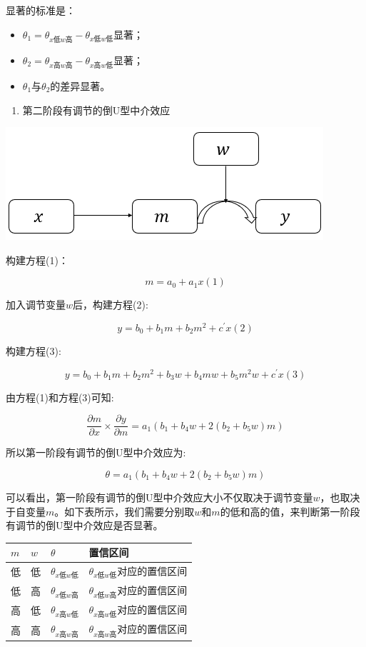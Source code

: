 \documentclass[
]{book}
\providecommand{\tightlist}{%
  \setlength{\itemsep}{0pt}\setlength{\parskip}{0pt}}
\begin{document}
显著的标准是：

\begin{itemize}
\item
  \(\theta_{1}=\theta_{x低w高}-\theta_{x低w低}\)显著；
\item
  \(\theta_{2}=\theta_{x高w高}-\theta_{x高w低}\)显著；
\item
  \(\theta_{1}\)与\(\theta_{2}\)的差异显著。
\end{itemize}

\begin{enumerate}
\def\labelenumi{\arabic{enumi}.}
\setcounter{enumi}{4}
\tightlist
\item
  第二阶段有调节的倒U型中介效应
\end{enumerate}

\includegraphics{figs/1225.png}

构建方程(1)：

\[
m=a_{0}+a_{1}x(1)
\]

加入调节变量\(w\)后，构建方程(2):

\[
y=b_{0}+b_{1}m+b_{2}m^{2}+c^{'}x(2)
\]

构建方程(3):

\[
y=b_{0}+b_{1}m+b_{2}m^{2}+b_{3}w+b_{4}mw+b_{5}m^{2}w+c^{'}x(3)
\]

由方程(1)和方程(3)可知:

\[
\frac{\partial m}{\partial x}{\times}\frac{\partial y}{\partial m}=a_{1}(b_{1}+b_{4}w+2(b_{2}+b_{5}w)m)
\]

所以第一阶段有调节的倒U型中介效应为:

\[
\theta=a_{1}(b_{1}+b_{4}w+2(b_{2}+b_{5}w)m)
\]

可以看出，第一阶段有调节的倒U型中介效应大小不仅取决于调节变量\(w\)，也取决于自变量\(m\)。如下表所示，我们需要分别取\(w\)和\(m\)的低和高的值，来判断第一阶段有调节的倒U型中介效应是否显著。

\begin{longtable}[]{@{}llll@{}}
\toprule
\(m\) & \(w\) & \(\theta\) & 置信区间\tabularnewline
\midrule
\endhead
低 & 低 & \(\theta_{x低w低}\) & \(\theta_{x低w低}\)对应的置信区间\tabularnewline
低 & 高 & \(\theta_{x低w高}\) & \(\theta_{x低w高}\)对应的置信区间\tabularnewline
高 & 低 & \(\theta_{x高w低}\) & \(\theta_{x高w低}\)对应的置信区间\tabularnewline
高 & 高 & \(\theta_{x高w高}\) & \(\theta_{x高w高}\)对应的置信区间\tabularnewline
\bottomrule
\end{longtable}
\end{document}
